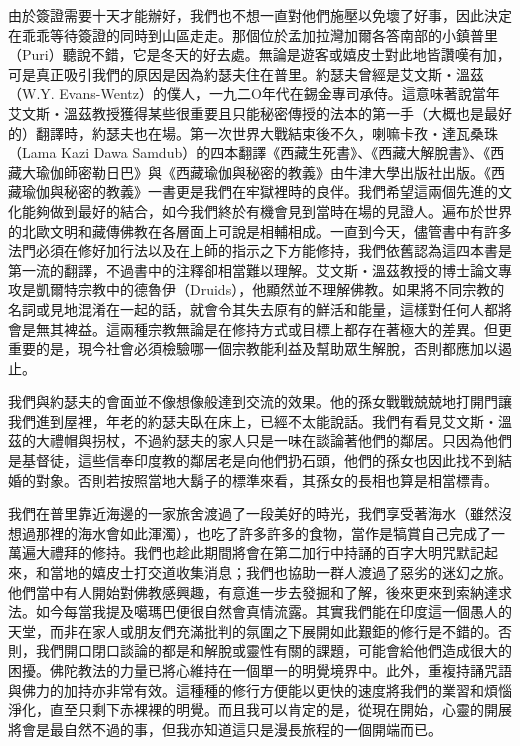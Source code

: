 由於簽證需要十天才能辦好，我們也不想一直對他們施壓以免壞了好事，因此決定在乖乖等待簽證的同時到山區走走。那個位於孟加拉灣加爾各答南部的小鎮普里（Puri）聽說不錯，它是冬天的好去處。無論是遊客或嬉皮士對此地皆讚嘆有加，可是真正吸引我們的原因是因為約瑟夫住在普里。約瑟夫曾經是艾文斯‧溫茲（W.Y.
Evans-Wentz）的僕人，一九二Ο年代在錫金專司承侍。這意味著說當年艾文斯‧溫茲教授獲得某些很重要且只能秘密傳授的法本的第一手（大概也是最好的）翻譯時，約瑟夫也在場。第一次世界大戰結束後不久，喇嘛卡孜‧達瓦桑珠（Lama
Kazi Dawa
Samdub）的四本翻譯《西藏生死書》、《西藏大解脫書》、《西藏大瑜伽師密勒日巴》與《西藏瑜伽與秘密的教義》由牛津大學出版社出版。《西藏瑜伽與秘密的教義》一書更是我們在牢獄裡時的良伴。我們希望這兩個先進的文化能夠做到最好的結合，如今我們終於有機會見到當時在場的見證人。遍布於世界的北歐文明和藏傳佛教在各層面上可說是相輔相成。一直到今天，儘管書中有許多法門必須在修好加行法以及在上師的指示之下方能修持，我們依舊認為這四本書是第一流的翻譯，不過書中的注釋卻相當難以理解。艾文斯‧溫茲教授的博士論文專攻是凱爾特宗教中的德魯伊（Druids），他顯然並不理解佛教。如果將不同宗教的名詞或見地混淆在一起的話，就會令其失去原有的鮮活和能量，這樣對任何人都將會是無其裨益。這兩種宗教無論是在修持方式或目標上都存在著極大的差異。但更重要的是，現今社會必須檢驗哪一個宗教能利益及幫助眾生解脫，否則都應加以遏止。

我們與約瑟夫的會面並不像想像般達到交流的效果。他的孫女戰戰兢兢地打開門讓我們進到屋裡，年老的約瑟夫臥在床上，已經不太能說話。我們有看見艾文斯‧溫茲的大禮帽與拐杖，不過約瑟夫的家人只是一味在談論著他們的鄰居。只因為他們是基督徒，這些信奉印度教的鄰居老是向他們扔石頭，他們的孫女也因此找不到結婚的對象。否則若按照當地大鬍子的標準來看，其孫女的長相也算是相當標青。

我們在普里靠近海邊的一家旅舍渡過了一段美好的時光，我們享受著海水（雖然沒想過那裡的海水會如此渾濁），也吃了許多許多的食物，當作是犒賞自己完成了一萬遍大禮拜的修持。我們也趁此期間將會在第二加行中持誦的百字大明咒默記起來，和當地的嬉皮士打交道收集消息；我們也協助一群人渡過了惡劣的迷幻之旅。他們當中有人開始對佛教感興趣，有意進一步去發掘和了解，後來更來到索納達求法。如今每當我提及噶瑪巴便很自然會真情流露。其實我們能在印度這一個愚人的天堂，而非在家人或朋友們充滿批判的氛圍之下展開如此艱鉅的修行是不錯的。否則，我們開口閉口談論的都是和解脫或靈性有關的課題，可能會給他們造成很大的困擾。佛陀教法的力量已將心維持在一個單一的明覺境界中。此外，重複持誦咒語與佛力的加持亦非常有效。這種種的修行方便能以更快的速度將我們的業習和煩惱淨化，直至只剩下赤裸裸的明覺。而且我可以肯定的是，從現在開始，心靈的開展將會是最自然不過的事，但我亦知道這只是漫長旅程的一個開端而已。

